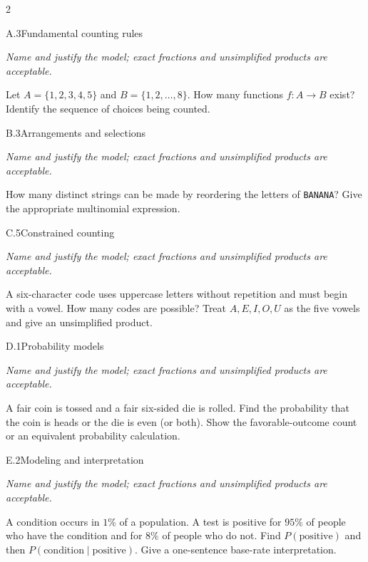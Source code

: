 \documentclass[9pt]{extarticle}
\begin{document}
\CoreWorkArea
\FormBreak
{}
\begin{multicols}{2}
\begin{CoreProblem}{A.3}{Fundamental counting rules}
{\scriptsize\textit{Name and justify the model; exact fractions and unsimplified products are acceptable.}\par}
Let $A=\{1,2,3,4,5\}$ and $B=\{1,2,\ldots,8\}$. How many functions
    $f:A\to B$ exist? Identify the sequence of choices being counted.
\end{CoreProblem}
\begin{CoreProblem}{B.3}{Arrangements and selections}
{\scriptsize\textit{Name and justify the model; exact fractions and unsimplified products are acceptable.}\par}
How many distinct strings can be made by reordering the letters of
    \texttt{BANANA}? Give the appropriate multinomial expression.
\end{CoreProblem}
\begin{CoreProblem}{C.5}{Constrained counting}
{\scriptsize\textit{Name and justify the model; exact fractions and unsimplified products are acceptable.}\par}
A six-character code uses uppercase letters without repetition and
    must begin with a vowel. How many codes are possible? Treat
    $A,E,I,O,U$ as the five vowels and give an unsimplified product.
\end{CoreProblem}
\columnbreak
\begin{CoreProblem}{D.1}{Probability models}
{\scriptsize\textit{Name and justify the model; exact fractions and unsimplified products are acceptable.}\par}
A fair coin is tossed and a fair six-sided die is rolled. Find the
    probability that the coin is heads or the die is even (or both). Show the
    favorable-outcome count or an equivalent probability calculation.
\end{CoreProblem}
\begin{CoreProblem}{E.2}{Modeling and interpretation}
{\scriptsize\textit{Name and justify the model; exact fractions and unsimplified products are acceptable.}\par}
A condition occurs in $1\%$ of a population. A test is positive for
    $95\%$ of people who have the condition and for $8\%$ of people who do not.
    Find $P(\text{positive})$ and then
    $P(\text{condition}\mid\text{positive})$. Give a one-sentence base-rate
    interpretation.
\end{CoreProblem}
\end{multicols}
\end{document}

